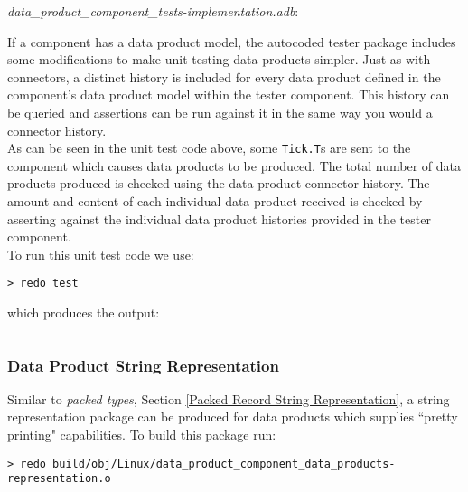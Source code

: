 \textit{data\_product\_component\_tests-implementation.adb}:

If a component has a data product model, the autocoded tester package includes some modifications to make unit testing data products simpler. Just as with connectors, a distinct history is included for every data product defined in the component's data product model within the tester component. This history can be queried and assertions can be run against it in the same way you would a connector history. \\

As can be seen in the unit test code above, some \texttt{Tick.T}s are sent to the component which causes data products to be produced. The total number of data products produced is checked using the data product connector history. The amount and content of each individual data product received is checked by asserting against the individual data product histories provided in the tester component. \\

To run this unit test code we use:

\vspace{5mm} %
\begin{verbatim}
> redo test
\end{verbatim}
\vspace{5mm} %

which produces the output:

\vspace{5mm} %
\inputminted{text}{../example_architecture/data_product_component/test/output.txt}
\vspace{5mm} %

\subsubsection{Data Product String Representation} \label{Data Product String Representation}

Similar to \textit{packed types}, Section \ref{Packed Record String Representation}, a string representation package can be produced for data products which supplies ``pretty printing" capabilities. To build this package run:

\vspace{5mm} %
\begin{verbatim}
> redo build/obj/Linux/data_product_component_data_products-representation.o
\end{verbatim}
\vspace{5mm} %

